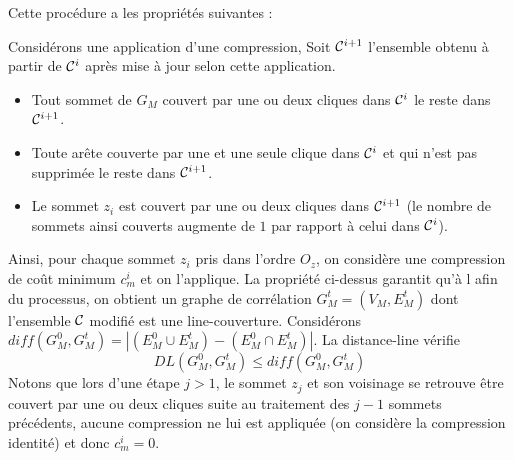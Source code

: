 Cette proc\'edure a les propri\'et\'es suivantes :
\begin{property}
Consid\'erons une application d'une compression,
Soit ${\cal C}^{i+1}$  l'ensemble obtenu \`a partir de ${\cal C}^{i}$ apr\`es  mise \`a jour selon cette application.
\begin{itemize}
	\item Tout sommet de $G_M$ couvert par une ou deux cliques dans ${\cal C}^{i}$ le reste dans ${\cal C}^{i+1}$.
	\item Toute ar\^ete couverte par une et une seule clique dans ${\cal C}^{i}$ et qui n'est pas supprim\'ee le reste dans ${\cal C}^{i+1}$.
	\item Le sommet $z_i$ est couvert par une ou deux cliques dans ${\cal C}^{i+1}$ (le nombre de sommets ainsi couverts augmente de $1$ par rapport \`a celui dans ${\cal C}^{i}$).
\end{itemize}
\end{property}

Ainsi, pour chaque sommet $z_i$ pris dans l'ordre $O_z$, on consid\`ere une compression de co\^ut minimum $c_m^i$ et on l'applique.
La propri\'et\'e ci-dessus garantit qu'\`a l afin du processus, on obtient un graphe de corr\'elation $G_M^t = (V_M, E_M^t)$ dont l'ensemble $\cal C$ modifi\'e est une line-couverture.
Consid\'erons $diff(G_M^0, G_M^t ) = | (E_M^0 \cup E_M^t)  - (E_M^0 \cap E_M^t) |$.
La distance-line v\'erifie  
$$DL( G_{M}^{0}, G_{M}^{t}) \le  diff(G_M^0, G_M^t ) $$
Notons que lors d'une \'etape $j > 1$, le sommet $z_j$ et son voisinage se retrouve \^etre couvert par une ou deux cliques suite au traitement des $j-1$ sommets pr\'ec\'edents, aucune compression ne lui est appliqu\'ee (on consid\`ere la compression identit\'e) et donc 
$c_{m}^{i} = 0$.